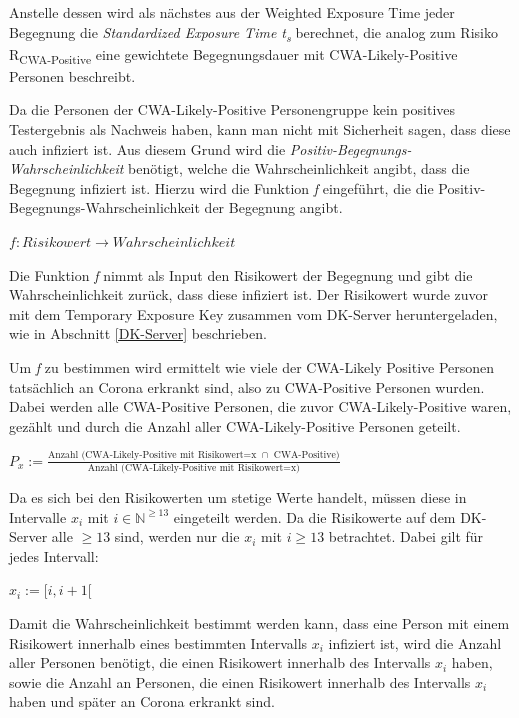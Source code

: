 \documentclass[conference,compsoc]{IEEEtran}
\begin{document}
Anstelle dessen wird als nächstes aus der Weighted Exposure Time jeder Begegnung die \textit{Standardized Exposure Time t\textsubscript{s}} berechnet,
die analog zum Risiko R\textsubscript{CWA-Positive} eine gewichtete Begegnungsdauer mit CWA-Likely-Positive Personen beschreibt.

Da die Personen der CWA-Likely-Positive Personengruppe kein positives Testergebnis als Nachweis haben, 
kann man nicht mit Sicherheit sagen, dass diese auch infiziert ist. 
Aus diesem Grund wird die \textit{Positiv-Begegnungs-Wahrscheinlichkeit} benötigt, welche die Wahrscheinlichkeit angibt, dass die Begegnung infiziert ist. 
Hierzu wird die Funktion \textit{f} eingeführt, die die Positiv-Begegnungs-Wahrscheinlichkeit der Begegnung angibt.

\centerline{\text{ }}
\centerline{$f: Risikowert \rightarrow Wahrscheinlichkeit$}
\centerline{\text{ }}

Die Funktion \textit{f} nimmt als Input den Risikowert der Begegnung und gibt die Wahrscheinlichkeit zurück, dass diese infiziert ist.
Der Risikowert wurde zuvor mit dem Temporary Exposure Key zusammen vom DK-Server heruntergeladen, wie in Abschnitt \ref{DK-Server} beschrieben.

Um \textit{f} zu bestimmen wird ermittelt wie viele der CWA-Likely Positive Personen tatsächlich an Corona erkrankt sind, also zu CWA-Positive Personen wurden.
Dabei werden alle CWA-Positive Personen, die zuvor CWA-Likely-Positive waren, gezählt und durch die Anzahl aller CWA-Likely-Positive Personen geteilt.

\centerline{\text{ }}
\centerline{$P_{x} := \frac{\text{Anzahl (CWA-Likely-Positive mit Risikowert=x } \cap \text{ CWA-Positive})}{\text{Anzahl (CWA-Likely-Positive mit Risikowert=x)}}$}
\centerline{\text{ }}

Da es sich bei den Risikowerten um stetige Werte handelt, müssen diese in Intervalle $x_i$ mit $i \in \mathbb{N}^{\geq 13}$ eingeteilt werden.
Da die Risikowerte auf dem DK-Server alle $\geq 13$ sind, werden nur die $x_i$ mit $i \geq 13$ betrachtet.
Dabei gilt für jedes Intervall:

\centerline{\text{ }}
\centerline{$x_i := [i, i+1[$}
\centerline{\text{ }}

Damit die Wahrscheinlichkeit bestimmt werden kann, dass eine Person mit einem Risikowert innerhalb eines bestimmten Intervalls $x_i$ infiziert ist, 
wird die Anzahl aller Personen benötigt, die einen Risikowert innerhalb des Intervalls $x_i$ haben, sowie die Anzahl an Personen, 
die einen Risikowert innerhalb des Intervalls $x_i$ haben und später an Corona erkrankt sind. 
\end{document}
